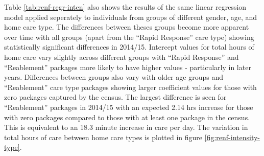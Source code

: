 \documentclass[]{article}
\begin{document}
Table \ref{tab:renf-regr-inten} also shows the results of the same
linear regression model applied seperately to individuals from groups of
different gender, age, and home care type. The differences between
theses groups become more apparent over time with all groups (apart from
the ``Rapid Response'' care type) showing statistically significant
differences in 2014/15. Intercept values for total hours of home care
vary slightly across different groups with ``Rapid Response'' and
``Reablement'' packages more likely to have higher values - particularly
in later years. Differences between groups also vary with older age
groups and ``Reablement'' care type packages showing larger coefficient
values for those with zero packages captured by the census. The largest
difference is seen for ``Reablement'' packages in 2014/15 with an
expected 2.14 hrs increase for those with zero packages compared to
those with at least one package in the census. This is equivalent to an
18.3 minute increase in care per day. The variation in total hours of
care between home care types is plotted in figure
\ref{fig:renf-intensity-type}.
\end{document}

